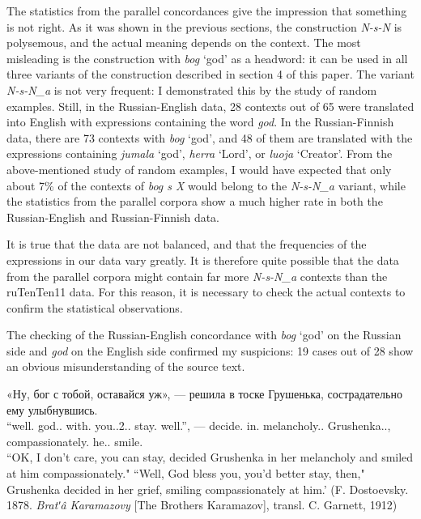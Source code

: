 \documentclass[output=paper]{langscibook}
\begin{document}
The statistics from the parallel concordances give the impression that something is not right. As it was shown in the previous sections, the construction \textit{N-s-N} is polysemous, and the actual meaning depends on the context. The most misleading is the construction with \textit{bog} ‘god’ as a headword: it can be used in all three variants of the construction described in section 4 of this paper. The variant \textit{N-s-N\_a} is not very frequent: I demonstrated this by the study of random examples. Still, in the Russian-English data, 28 contexts out of 65 were translated into English with expressions containing the word \textit{god}. In the Russian-Finnish data, there are 73 contexts with \textit{bog} ‘god’, and 48 of them are translated with the expressions containing \textit{jumala} ‘god’, \textit{herra} ‘Lord’, or \textit{luoja} ‘Creator’. From the above-mentioned study of random examples, I would have expected that only about 7\% of the contexts of \textit{bog s X} would belong to the \textit{N-s-N\_a} variant, while the statistics from the parallel corpora show a much higher rate in both the Russian-English and Russian-Finnish data.

It is true that the data are not balanced, and that the frequencies of the expressions in our data vary greatly. It is therefore quite possible that the data from the parallel corpora might contain far more \textit{N-s-N\_a} contexts than the ruTenTen11 data. For this reason, it is necessary to check the actual contexts to confirm the statistical observations.

\largerpage
The checking of the Russian-English concordance with \textit{bog} ‘god’ on the Russian side and \textit{god} on the English side confirmed my suspicions: 19 cases out of 28 show an obvious misunderstanding of the source text.

\ea \label{ex:mikhailov:12}
\gll «Ну, бог с тобой, оставайся уж», — решила в тоске Грушенька, сострадательно ему улыбнувшись.\\
     “well.{\PTCP} god.{\NOUN}.{\NOM} with.{\PREP} you.{\PRON}.2.{\INSTR}.{\SG} stay.{\IMP} well.{\PTCP}”, — decide.{\PAST}{\glossF}{\SG} in.{\PREP} melancholy.{\NOUN}.{\LOC}{\SG} Grushenka.{\NOUNPROPER}.{\NOM}, compassionately.{\ADV} he.{\PRON}.{\DAT}{\SG} smile.{\GERUND}\\
\glt ``OK, I don’t care, you can stay, decided Grushenka in her melancholy and smiled at him compassionately."
\newpage
\glt ``Well, God bless you, you’d better stay, then," Grushenka decided in her grief, smiling compassionately at him.' (F. Dostoevsky. 1878. \textit{Bratʹâ Karamazovy} [The Brothers Karamazov], transl. C. Garnett, 1912)\z
\end{document}
